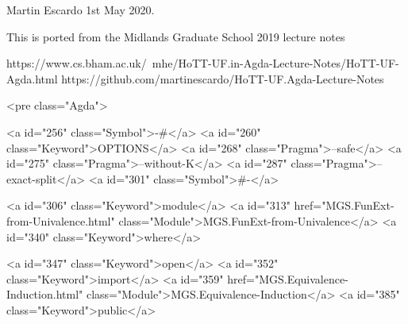 Martin Escardo 1st May 2020.

This is ported from the Midlands Graduate School 2019 lecture notes

 https://www.cs.bham.ac.uk/~mhe/HoTT-UF.in-Agda-Lecture-Notes/HoTT-UF-Agda.html
 https://github.com/martinescardo/HoTT-UF.Agda-Lecture-Notes

<pre class="Agda">

<a id="256" class="Symbol">{-#</a> <a id="260" class="Keyword">OPTIONS</a> <a id="268" class="Pragma">--safe</a> <a id="275" class="Pragma">--without-K</a> <a id="287" class="Pragma">--exact-split</a> <a id="301" class="Symbol">#-}</a>

<a id="306" class="Keyword">module</a> <a id="313" href="MGS.FunExt-from-Univalence.html" class="Module">MGS.FunExt-from-Univalence</a> <a id="340" class="Keyword">where</a>

<a id="347" class="Keyword">open</a> <a id="352" class="Keyword">import</a> <a id="359" href="MGS.Equivalence-Induction.html" class="Module">MGS.Equivalence-Induction</a> <a id="385" class="Keyword">public</a>

